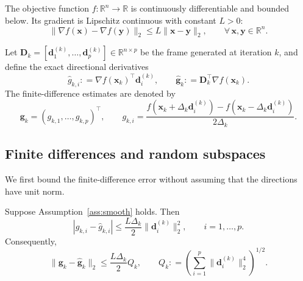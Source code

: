 \documentclass{siamart171218}
\newcommand{\bx}{\bm{x}}
\newcommand{\bd}{\bm{d}}
\newcommand{\bg}{\bm{g}}
\providecommand{\coloneqq}{\mathrel{\mathop:}=}
\begin{document}
\begin{assumption}
\label{ass:smooth}
The objective function $f:\mathbb R^n\to\mathbb R$ is continuously differentiable and bounded below. Its gradient is Lipschitz continuous with constant $L>0$:
\begin{equation}
\label{eq:lipschitz_grad}
\|\nabla f(\bx)-\nabla f(\bm y)\|_2 \le L\|\bx-\bm y\|_2, \qquad \forall\, \bx,\bm y\in\mathbb R^n.
\end{equation}
\end{assumption}

Let $\bm D_k = [\bd_1^{(k)},\ldots,\bd_p^{(k)}] \in \mathbb{R}^{n \times p}$ be the frame generated at iteration $k$, and define the exact directional derivatives
\[
\hat g_{k,i} \coloneqq \nabla f(\bx_k)^\top\bd_i^{(k)}, \qquad \hat{\bg}_k \coloneqq \bm D_k^\top\nabla f(\bx_k).
\]
The finite-difference estimates are denoted by
\[
\bg_k = (g_{k,1},\ldots,g_{k,p})^\top, \qquad g_{k,i} = \frac{f(\bx_k+\Delta_k\bd_i^{(k)}) - f(\bx_k-\Delta_k\bd_i^{(k)})}{2\Delta_k}.
\]

\subsection{Finite differences and random subspaces}
\label{subsec:estimation}

We first bound the finite-difference error without assuming that the directions have unit norm.

\begin{lemma}
\label{lem:fd_general}
\label{lem:fd}
Suppose Assumption~\ref{ass:smooth} holds. Then
\begin{equation}
\label{eq:fd_general_component}
|g_{k,i}-\hat g_{k,i}| \le \frac{L\Delta_k}{2} \|\bd_i^{(k)}\|_2^2, \qquad i=1,\ldots,p.
\end{equation}
Consequently,
\begin{equation}
\label{eq:fd_general_vector}
\|\bg_k-\hat{\bg}_k\|_2 \le \frac{L\Delta_k}{2} Q_k, \qquad Q_k \coloneqq \left( \sum_{i=1}^p \|\bd_i^{(k)}\|_2^4 \right)^{1/2}.
\end{equation}
\end{lemma}
\end{document}
